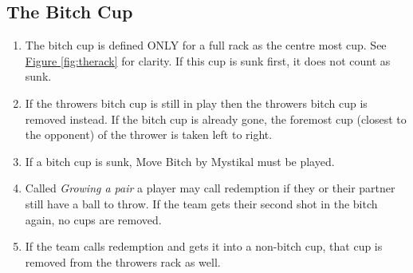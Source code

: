 	\subsection{The Bitch Cup}\label{ssec:BitchCup}
		\begin{enumerate}[label=(\roman*), ref=\roman*]
            \item \label{sssec:BitchCup,def} The bitch cup is defined ONLY for a full rack as the centre most cup.
                See \hyperref[fig:therack]{Figure \ref*{fig:therack}} for clarity. If this cup is sunk first, it does not count as sunk.
            \item \label{sssec:BitchCup,rem} If the throwers bitch cup is still in play then the throwers bitch cup is removed instead.
                If the bitch cup is already gone, the foremost cup (closest to the opponent) of the thrower is taken left to right.
            \item \label{sssec:BitchCup,song} If a bitch cup is sunk, Move Bitch by Mystikal must be played.
            \item \label{sssec:BitchCup,redemption} Called \emph{Growing a pair} a player may call redemption if they or their partner still have a ball to throw.
                If the team gets their second shot in the bitch again, no cups are removed.
            \item \label{sssec:BitchCup,redemptionFail} If the team calls redemption and gets it into a non-bitch cup, that cup is removed from the throwers rack as well.
        \end{enumerate}
